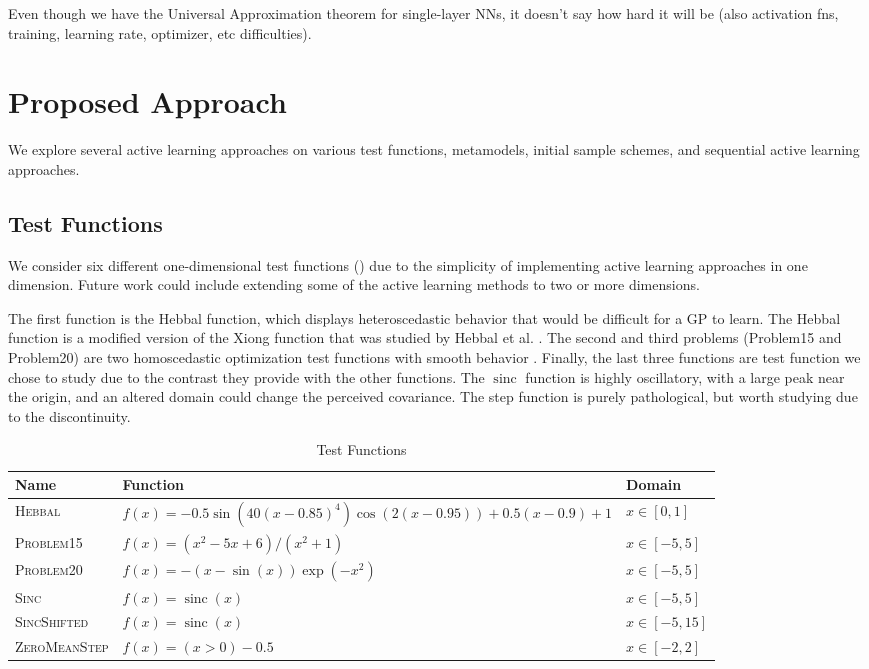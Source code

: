 \documentclass[conference]{IEEEtran}
\DeclareMathOperator{\sinc}{sinc}
\begin{document}
	Even though we have the Universal Approximation theorem for single-layer NNs, it doesn't say how hard it will be (also activation fns, training, learning rate, optimizer, etc difficulties). 

	\section{Proposed Approach}
	\label{sec:proposed-approach}
	
	We explore several active learning approaches on various test functions, metamodels, initial sample schemes, and sequential active learning approaches.
	
	\subsection{Test Functions}
	
	We consider six different one-dimensional test functions () due to the simplicity of implementing active learning approaches in one dimension. Future work could include extending some of the active learning methods to two or more dimensions.
	
	The first function is the Hebbal function, which displays heteroscedastic behavior that would be difficult for a GP to learn. The Hebbal function is a modified version of the Xiong function that was studied by Hebbal et al. \cite{hebbal2019bayesian}. The second and third problems (Problem15 and Problem20) are two homoscedastic optimization test functions with smooth behavior \cite{1-DFunctions}. Finally, the last three functions are test function we chose to study due to the contrast they provide with the other functions. The $\sinc$ function is highly oscillatory, with a large peak near the origin, and an altered domain could change the perceived covariance. The step function is purely pathological, but worth studying due to the discontinuity. 
	
	\begin{table*}[htbp]
    \renewcommand{\arraystretch}{1.3}
    \centering
    \caption{Test Functions}
    \label{tab:test_fns}
        \begin{tabular}{lll}
        \toprule 
        \bfseries Name & \bfseries Function & \bfseries Domain \\ \midrule
	    \textsc{Hebbal} & $f(x) = -0.5 \sin\left(40 (x-0.85)^4\right) \cos(2(x-0.95)) + 0.5(x-0.9) + 1$ & $x \in [0, 1]$ \\
	    \textsc{Problem15} & $f(x) = (x^2 - 5x + 6) / (x^2 + 1) $ & $x \in [-5, 5]$ \\
	    \textsc{Problem20} & $f(x) = -(x - \sin(x))\exp(-x^2) $ & $x \in [-5, 5]$ \\
	    \textsc{Sinc} & $f(x) = \sinc(x) $ & $x \in [-5, 5]$ \\
	    \textsc{SincShifted} & $f(x) = \sinc(x) $ & $x \in [-5, 15]$ \\
	    \textsc{ZeroMeanStep} & $f(x) = (x > 0) - 0.5 $ & $x \in [-2, 2]$ \\
	    \bottomrule
	    \end{tabular}
	\end{table*}
	
\end{document}
